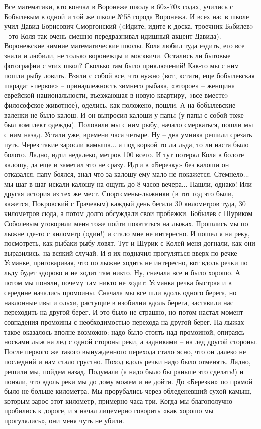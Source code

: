 Все математики, кто кончал в Воронеже школу в 60х-70х годах, учились с Бобылевым в одной и той же школе №58 города Воронежа. И всех нас в школе учил Давид Борисович Сморгонский («Идите, идите к доска, троечник Бaбилев» - это Коля так очень смешно передразнивал идишный акцент Давида). Воронежские зимние математические школы. Коля любил туда ездить, его все знали и любили, не только воронежцы и москвичи. Остались ли бытовые фотографии с этих школ? Сколько там было приключений! Как-то мы с ним пошли рыбу ловить. Взяли с собой все, что нужно (вот, кстати, еще бобылевская шарада: «первое» – принадлежность зимнего рыбака, «второе» – женщина еврейской национальности, въезжающая в новую квартиру, «все вместе» – философское животное), оделись, как положено, пошли. А на бобылевские валенки не было калош. И он выпросил калоши у папы (у папы с собой тоже был комплект одежды). Половили мы с ним рыбу, начало смеркаться, пошли мы с ним назад. Устали уже, времени часа четыре. Ну – два умника решили срезать путь. Через такие заросли камыша... а под коркой то ли льда, то ли наста было болото. Ладно, идти недалеко, метров 100 всего. И тут потерял Коля в болоте калошу, да еще и заметил это не сразу. Идти в «Березку» без калоши он отказался, папу боялся, знал что за калошу ему мало не покажется. Стемнело... мы шаг в шаг искали калошу на ощупь до 8 часов вечера... Нашли, однако! Или другая история из тех же мест. Спортсмены-лыжники (в тот год это были, кажется, Покровский с Грачевым) каждый день бегали 30 километров туда, 30 километров сюда, а потом долго обсуждали свои пробежки. Бобылев с Шуриком Соболевым уговорили меня тоже пойти покататься на лыжах. Прошлись мы по лыжне где-то с километр (один!) и стало мне не интересно. И пошел я на реку, посмотреть, как рыбаки рыбу ловят. Тут и Шурик с Колей меня догнали, как они выразились, на всякий случай. И я их подначил прогуляться вверх по речке Усманке, приговаривая, что по лыжне ходить не интересно, вот вдоль речки по льду будет здорово и не ходит там никто. Ну, сначала все и было хорошо. А потом мы поняли, почему там никто не ходит: Усманка речка быстрая и в середине начались промоины. Сначала мы все шли вдоль одного берега, но наклонные ивы и ольхи, растущие в изобилии вдоль берега, заставили нас переходить на другой берег. И это было не страшно, но потом настал момент совпадения промоины с необходимостью перехода на другой берег. На лыжах такое оказалось вполне возможно: надо было стоять над промоиной, опираясь носками лыж на лед с одной стороны реки, а задниками – на лед другой стороны. После первого же такого вынужденного перехода стало ясно, что он далеко не последний и нам стало грустно. Поход вдоль речки надо было отменять. Ладно, решили мы, пойдем назад. Подумали (а надо было бы раньше это сделать!) и поняли, что вдоль реки мы до дому можем и не дойти. До «Березки» по прямой было не больше километра. Мы прорубались через обледеневший сухой камыш, которым зарос этот километр, примерно часа три. Когда мы благополучно пробились к дороге, и я начал лицемерно говорить «как хорошо мы прогулялись», они меня чуть не убили.


